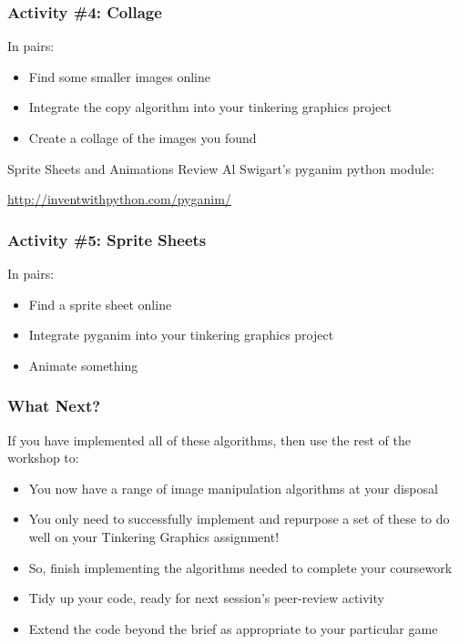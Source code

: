 
\begin{frame}
	\frametitle{Activity \#4: Collage}
	
	In pairs:
	
	\vspace{2em}
	
	\begin{itemize}		
		\item Find some smaller images online
		\item Integrate the copy algorithm into your tinkering graphics project
		\item Create a collage of the images you found
	\end{itemize}
\end{frame}

\begin{frame}{Sprite Sheets and Animations}
	Review Al Swigart's pyganim python module: 
	
	\vspace{2em}
	
	\url{http://inventwithpython.com/pyganim/}
	
\end{frame}

\begin{frame}
	\frametitle{Activity \#5: Sprite Sheets}
	
	In pairs:
	
	\vspace{2em}
	
	\begin{itemize}		
		\item Find a sprite sheet online
		\item Integrate pyganim into your tinkering graphics project
		\item Animate something
	\end{itemize}
\end{frame}

\begin{frame}
	\frametitle{What Next?}
	
	If you have implemented all of these algorithms, then use the rest of the workshop to:
	
	\vspace{2em}
	
	\begin{itemize}	
		\item You now have a range of image manipulation algorithms at your disposal
		\item You only need to successfully implement and repurpose a set of these to do well on your Tinkering Graphics assignment!
		\item So, finish implementing the algorithms needed to complete your coursework
		\item Tidy up your code, ready for next session's peer-review activity
		\item Extend the code beyond the brief as appropriate to your particular game
	\end{itemize}
\end{frame}


